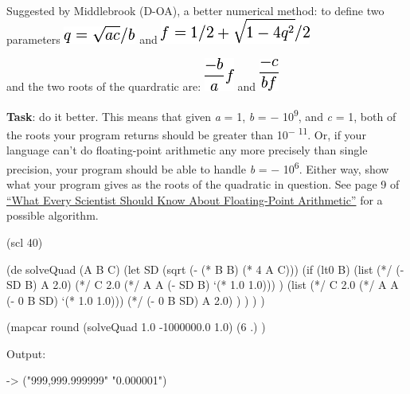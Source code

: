 Suggested by Middlebrook (D-OA), a better numerical method: to define
two parameters
\includegraphics[scale=.6]{graphics/1b0829cacb50a2b671f2807fe80c911c.png}
and
\includegraphics[scale=.6]{graphics/688bcacb300f8efe5d6d8f6411d13d96.png}

and the two roots of the quardratic are:
\includegraphics[scale=.6]{graphics/4bcc0c5a2bb6223fa81b5bc6f0001367.png}
and
\includegraphics[scale=.6]{graphics/06242fdab96c6fc34555b2d3ac36ff56.png}

\textbf{Task}: do it better. This means that given \emph{a} = 1,
\emph{b} = − 10\textsuperscript{9}, and \emph{c} = 1, both of the roots
your program returns should be greater than 10\textsuperscript{− 11}.
Or, if your language can't do floating-point arithmetic any more
precisely than single precision, your program should be able to handle
\emph{b} = − 10\textsuperscript{6}. Either way, show what your program
gives as the roots of the quadratic in question. See page 9 of
\href{http://dlc.sun.com/pdf/800-7895/800-7895.pdf}{``What Every
Scientist Should Know About Floating-Point Arithmetic''} for a possible
algorithm.

\begin{wideverbatim}

(scl 40)

(de solveQuad (A B C)
   (let SD (sqrt (- (* B B) (* 4 A C)))
      (if (lt0 B)
         (list
            (*/ (- SD B) A 2.0)
            (*/ C 2.0 (*/ A A (- SD B) `(* 1.0 1.0))) )
         (list
            (*/ C 2.0 (*/ A A (- 0 B SD) `(* 1.0 1.0)))
            (*/ (- 0 B SD) A 2.0) ) ) ) )

(mapcar round
   (solveQuad 1.0 -1000000.0 1.0)
   (6 .) )

Output:

-> ("999,999.999999" "0.000001")

\end{wideverbatim}

